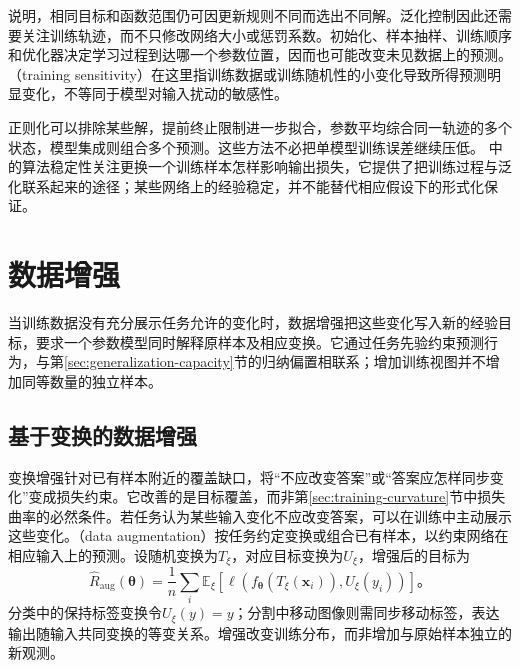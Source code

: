 说明，相同目标和函数范围仍可因更新规则不同而选出不同解。泛化控制因此还需要关注训练轨迹，而不只修改网络大小或惩罚系数。初始化、样本抽样、训练顺序和优化器决定学习过程到达哪一个参数位置，因而也可能改变未见数据上的预测。（training sensitivity）在这里指训练数据或训练随机性的小变化导致所得预测明显变化，不等同于模型对输入扰动的敏感性。

正则化可以排除某些解，提前终止限制进一步拟合，参数平均综合同一轨迹的多个状态，模型集成则组合多个预测。这些方法不必把单模型训练误差继续压低。
中的算法稳定性关注更换一个训练样本怎样影响输出损失，它提供了把训练过程与泛化联系起来的途径；某些网络上的经验稳定，并不能替代相应假设下的形式化保证。

\section{数据增强}
\label{sec:generalization-augmentation}

当训练数据没有充分展示任务允许的变化时，数据增强把这些变化写入新的经验目标，要求一个参数模型同时解释原样本及相应变换。它通过任务先验约束预测行为，与第\ref{sec:generalization-capacity}节的归纳偏置相联系；增加训练视图并不增加同等数量的独立样本。

\subsection{基于变换的数据增强}
\label{sec:generalization-transform-augmentation}

变换增强针对已有样本附近的覆盖缺口，将“不应改变答案”或“答案应怎样同步变化”变成损失约束。它改善的是目标覆盖，而非第\ref{sec:training-curvature}节中损失曲率的必然条件。若任务认为某些输入变化不应改变答案，可以在训练中主动展示这些变化。（data augmentation）按任务约定变换或组合已有样本，以约束网络在相应输入上的预测。设随机变换为$T_{\xi}$，对应目标变换为$U_{\xi}$，增强后的目标为
\begin{equation}
  \hat R_{\mathrm{aug}}(\bm\theta)
  =\frac1n\sum_i\mathbb E_{\xi}
    [\ell(f_{\bm\theta}(T_{\xi}(\bm x_i)),U_{\xi}(y_i))]\text{。}
  \label{eq:generalization-augmentation-risk}
\end{equation}
分类中的保持标签变换令$U_{\xi}(y)=y$；分割中移动图像则需同步移动标签，表达输出随输入共同变换的等变关系。增强改变训练分布，而非增加与原始样本独立的新观测。

